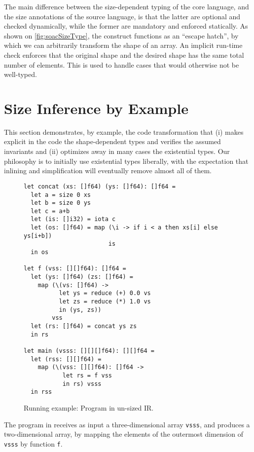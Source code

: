 The main difference between the size-dependent typing of the core
language, and the size annotations of the source language, is that the
latter are optional and checked dynamically, while the former are
mandatory and enforced statically.  As shown on
\cref{fig:soacSizeType}, the  construct functions as an
``escape hatch'', by which we can arbitrarily transform the shape of
an array.  An implicit run-time check enforces that the original shape
and the desired shape has the same total number of elements.  This is
used to handle cases that would otherwise not be well-typed.

\section{Size Inference by Example}
\label{sec:size-analysis-intuition}

This section demonstrates, by example, the code transformation that
(i) makes explicit in the code the shape-dependent types and verifies
the assumed invariants and (ii) optimizes away in many cases the
existential types.  Our philosophy is to initially use existential
types liberally, with the expectation that inlining and simplification
will eventually remove almost all of them.

\begin{figure}
\begin{lstlisting}
let concat (xs: []f64) (ys: []f64): []f64 =
  let a = size 0 xs
  let b = size 0 ys
  let c = a+b
  let (is: []i32) = iota c
  let (os: []f64) = map (\i -> if i < a then xs[i] else ys[i+b])
                        is
  in os

let f (vss: [][]f64): []f64 =
  let (ys: []f64) (zs: []f64) =
    map (\(vs: []f64) ->
          let ys = reduce (+) 0.0 vs
          let zs = reduce (*) 1.0 vs
          in (ys, zs))
        vss
  let (rs: []f64) = concat ys zs
  in rs

let main (vsss: [][][]f64): [][]f64 =
  let (rss: [][]f64) =
    map (\(vss: [][]f64): []f64 ->
           let rs = f vss
           in rs) vsss
  in rss
\end{lstlisting}

\caption{Running example: Program in un-sized IR.} 
\label{fig:RunEgSrc}
\end{figure}

The program in  receives as input a
three-dimensional array \texttt{vsss}, and produces a two-dimensional
array, by mapping the elements of the outermost dimension of
\texttt{vsss} by function \texttt{f}.

